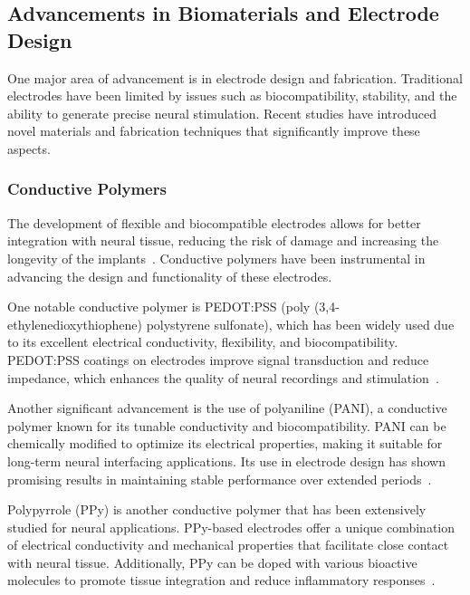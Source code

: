 \documentclass[twocolumn,10pt]{article}
\begin{document}
\subsection*{Advancements in Biomaterials and Electrode Design}
One major area of advancement is in electrode design and fabrication.
Traditional electrodes have been limited by issues such as biocompatibility,
stability, and the ability to generate precise neural stimulation. Recent
studies have introduced novel materials and fabrication techniques that
significantly improve these aspects.

\subsubsection*{Conductive Polymers}
The development of flexible and biocompatible electrodes allows for better
integration with neural tissue, reducing the risk of damage and increasing the
longevity of the implants~\parencite{xiangFlexibleThreedimensionalElectrode2016}.
Conductive polymers have been instrumental in advancing the design and
functionality of these electrodes.

One notable conductive polymer is PEDOT:PSS (poly (3,4-ethylenedioxythiophene)
polystyrene sulfonate), which has been widely used due to its excellent
electrical conductivity, flexibility, and biocompatibility. PEDOT:PSS coatings
on electrodes improve signal transduction and reduce impedance, which enhances
the quality of neural recordings and
stimulation~\parencite{rivnayHighperformanceTransistorsBioelectronics2015}.

Another significant advancement is the use of polyaniline (PANI), a conductive
polymer known for its tunable conductivity and biocompatibility. PANI can be
chemically modified to optimize its electrical properties, making it suitable
for long-term neural interfacing applications. Its use in electrode design has
shown promising results in maintaining stable performance over extended
periods~\parencite{almuflehHighlyFlexiblePolyanilineBased2021}.

Polypyrrole (PPy) is another conductive polymer that has been extensively
studied for neural applications. PPy-based electrodes offer a unique combination
of electrical conductivity and mechanical properties that facilitate close
contact with neural tissue. Additionally, PPy can be doped with various
bioactive molecules to promote tissue integration and reduce inflammatory
responses~\parencite{zareElectroconductiveMultifunctionalPolypyrrole2021a}.
\end{document}
